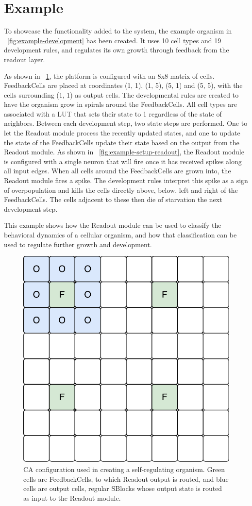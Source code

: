 \section{Example}
\label{sec:selfreg-example}

To showcase the functionality added to the system, the example organism in
\figurename~\ref{fig:example-development} has been created. It uses 10 cell
types and 19 development rules, and regulates its own growth through feedback
from the readout layer.

As shown in \figurename~\ref{fig:example-setup-ca}, the platform is configured
with an 8x8 matrix of cells. FeedbackCells are placed at coordinates (1, 1), (1,
5), (5, 1) and (5, 5), with the cells surrounding (1, 1) as output cells. The
developmental rules are created to have the organism grow in spirals around the
FeedbackCells. All cell types are associated with a LUT that sets their state to
1 regardless of the state of neighbors. Between each development step, two state
steps are performed. One to let the Readout module process the recently updated
states, and one to update the state of the FeedbackCells update their state
based on the output from the Readout module. As shown in
\figurename~\ref{fig:example-setup-readout}, the Readout module is configured
with a single neuron that will fire once it has received spikes along all input
edges. When all cells around the FeedbackCells are grown into, the Readout
module fires a spike. The development rules interpret this spike as a sign of
overpopulation and kills the cells directly above, below, left and right of the
FeedbackCells. The cells adjacent to these then die of starvation the next
development step.

This example shows how the Readout module can be used to classify the behavioral
dynamics of a cellular organism, and how that classification can be used to
regulate further growth and development.

\begin{figure}[ht]
  \centering
  \includegraphics[width=0.4\linewidth]{fig/example-setup}
  \caption{
    CA configuration used in creating a self-regulating organism. Green cells
    are FeedbackCells, to which Readout output is routed, and blue cells are output
    cells, regular SBlocks whose output state is routed as input to the Readout
    module.
  }
  \label{fig:example-setup-ca}
\end{figure}

